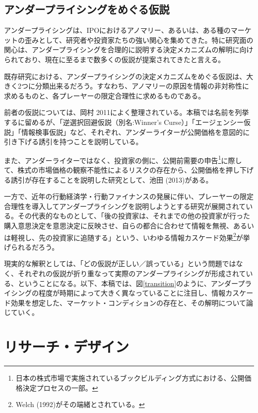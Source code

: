 \documentclass{jsarticle}
\begin{document}
\subsection{アンダープライシングをめぐる仮説}
アンダープライシングは、IPOにおけるアノマリー、あるいは、ある種のマーケットの歪みとして、研究者や投資家たちの強い関心を集めてきた。特に研究面の関心は、アンダープライシングを合理的に説明する決定メカニズムの解明に向けられており、現在に至るまで数多くの仮説が提案されてきたと言える。\par
既存研究における、アンダープライシングの決定メカニズムをめぐる仮説は、大きく2つに分類出来るだろう。すなわち、アノマリーの原因を情報の非対称性に求めるものと、各プレーヤーの限定合理性に求めるものである。\par
前者の仮説については、岡村 2011\cite{okamura}によく整理されている。本稿では名前を列挙するに留めるが、「逆選択回避仮説（別名:Winner's Curse）」「エージェンシー仮説」「情報検事仮説」など、それぞれ、アンダーライターが公開価格を意図的に引き下げる誘引を持つことを説明している。\par

また、アンダーライターではなく、投資家の側に、公開前需要の申告\footnote[5]{日本の株式市場で実施されているブックビルディング方式における、公開価格決定プロセスの一部。}に際して、株式の市場価格の観察不能性によるリスクの存在から、公開価格を押し下げる誘引が存在することを説明した研究として、池田 (2013)\cite{ikeda}がある。\par

一方で、近年の行動経済学・行動ファイナンスの発展に伴い、プレーヤーの限定合理性を導入してアンダープライシングを説明しようとする研究が展開されている。その代表的なものとして、「後の投資家は、それまでの他の投資家が行った購入意思決定を意思決定に反映させ、自らの都合に合わせて情報を無視、あるいは軽視し、先の投資家に追随する」という、いわゆる情報カスケード効果\footnote[6]{Welch (1992)\cite{Welch}がその端緒とされている。}が挙げられるだろう。\par




現実的な解釈としては、「どの仮説が正しい／誤っている」という問題ではなく、それぞれの仮説が折り重なって実際のアンダープライシングが形成されている、ということになる。以下、本稿では、図\ref{transition}のように、アンダープライシングの程度が時期によって大きく異なっていることに注目し、情報カスケード効果を想定した、マーケット・コンディションの存在と、その解明について論じていく。

\section{リサーチ・デザイン}
\end{document}
